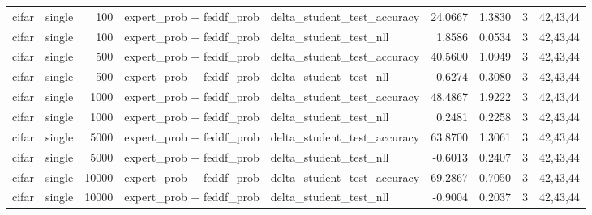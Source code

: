 \begin{tabular}{llrllrrrl}
cifar & single & 100 & expert\_prob − feddf\_prob & delta\_student\_test\_accuracy & 24.0667 & 1.3830 & 3 & 42,43,44 \\
cifar & single & 100 & expert\_prob − feddf\_prob & delta\_student\_test\_nll & 1.8586 & 0.0534 & 3 & 42,43,44 \\
cifar & single & 500 & expert\_prob − feddf\_prob & delta\_student\_test\_accuracy & 40.5600 & 1.0949 & 3 & 42,43,44 \\
cifar & single & 500 & expert\_prob − feddf\_prob & delta\_student\_test\_nll & 0.6274 & 0.3080 & 3 & 42,43,44 \\
cifar & single & 1000 & expert\_prob − feddf\_prob & delta\_student\_test\_accuracy & 48.4867 & 1.9222 & 3 & 42,43,44 \\
cifar & single & 1000 & expert\_prob − feddf\_prob & delta\_student\_test\_nll & 0.2481 & 0.2258 & 3 & 42,43,44 \\
cifar & single & 5000 & expert\_prob − feddf\_prob & delta\_student\_test\_accuracy & 63.8700 & 1.3061 & 3 & 42,43,44 \\
cifar & single & 5000 & expert\_prob − feddf\_prob & delta\_student\_test\_nll & -0.6013 & 0.2407 & 3 & 42,43,44 \\
cifar & single & 10000 & expert\_prob − feddf\_prob & delta\_student\_test\_accuracy & 69.2867 & 0.7050 & 3 & 42,43,44 \\
cifar & single & 10000 & expert\_prob − feddf\_prob & delta\_student\_test\_nll & -0.9004 & 0.2037 & 3 & 42,43,44 \\
\bottomrule
\end{tabular}

